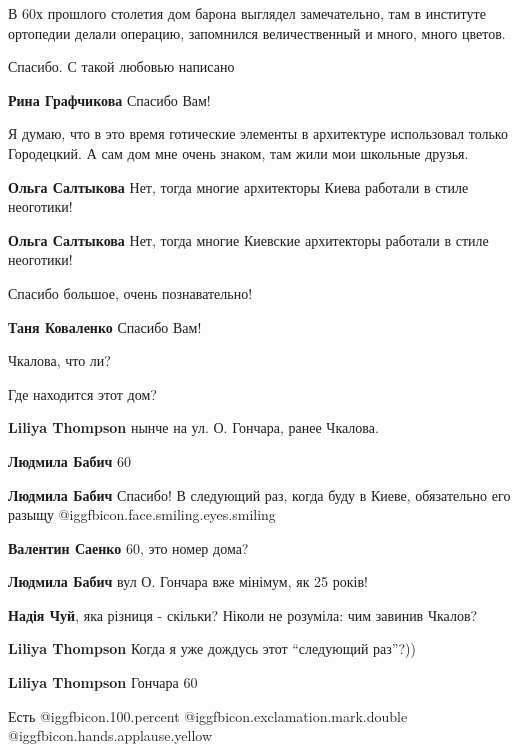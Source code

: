 \begin{itemize}
В 60х прошлого столетия дом барона выглядел замечательно, там в институте
ортопедии делали операцию, запомнился величественный и много, много цветов.

Спасибо. С такой любовью написано

\textbf{Рина Графчикова} Спасибо Вам!


Я думаю, что в это время готические элементы в архитектуре использовал только
Городецкий. А сам дом мне очень знаком, там жили мои школьные друзья.

\textbf{Ольга Салтыкова} Нет, тогда многие архитекторы Киева работали в стиле неоготики!

\textbf{Ольга Салтыкова} Нет, тогда многие Киевские архитекторы работали в стиле неоготики!

Спасибо большое, очень познавательно!

\textbf{Таня Коваленко} Спасибо Вам!

Чкалова, что ли?

Где находится этот дом?

\begin{itemize} %
\textbf{Liliya Thompson} нынче на ул. О. Гончара, ранее Чкалова.

\textbf{Людмила Бабич} 60

\textbf{Людмила Бабич} Спасибо! В следующий раз, когда буду в Киеве, обязательно его разыщу  @igg{fbicon.face.smiling.eyes.smiling} 

\textbf{Валентин Саенко} 60, это номер дома?

\textbf{Людмила Бабич} вул О. Гончара вже мінімум, як 25 років!

\textbf{Надія Чуй}, яка різниця - скільки? Ніколи не розуміла: чим завинив Чкалов?

\textbf{Liliya Thompson} Когда я уже дождусь этот \enquote{следующий раз}?))

\textbf{Liliya Thompson} Гончара 60
\end{itemize} %

Есть  @igg{fbicon.100.percent} @igg{fbicon.exclamation.mark.double} ️  @igg{fbicon.hands.applause.yellow} 


\end{itemize}
